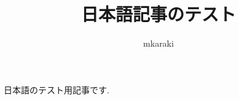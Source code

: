 \documentclass{article}
\title{日本語記事のテスト}
\author{mkaraki}
\begin{document}
日本語のテスト用記事です.
\end{document}
